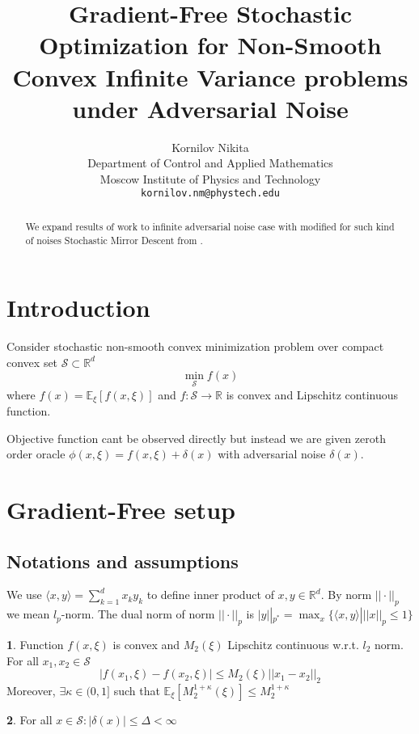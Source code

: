 \documentclass{article}
\title{Gradient-Free Stochastic Optimization for Non-Smooth Convex  Infinite Variance problems under Adversarial Noise}
\author{ Kornilov Nikita\\
	Department of Control and Applied Mathematics\\
	Moscow Institute of Physics and Technology\\
	\texttt{kornilov.nm@phystech.edu} \\
}
\date{}
\makeatletter
\newcommand{\RR}{\mathcal{R}}
\theoremstyle{definition}
\newtheorem*{assumption*}{\assumptionnumber}
\providecommand{\assumptionnumber}{}
\newenvironment{assumption}[2]
 {%
  \renewcommand{\assumptionnumber}{Assumption #1}%
  \begin{assumption*}%
  \protected@edef\@currentlabel{#1}%
 }
 {%
  \end{assumption*}
 }
\theoremstyle{remark}
\def\RR{\mathbb{R}}
\def\EE{\mathbb{E}}
\makeatother
\begin{document}
\maketitle

\begin{abstract}
We expand results of work \cite{dvinskikh2022gradient} to infinite adversarial noise case with modified for such kind of noises Stochastic Mirror Descent from \cite{vural2022mirror}. 
\end{abstract}



\section{Introduction}
Consider stochastic non-smooth convex minimization problem over compact convex set $\mathcal{S} \subset \RR^d$
$$\min\limits_{\mathcal{S}} f(x) $$
where $f(x) =  \EE_\xi [f(x, \xi)]$ and $f: \mathcal{S} \rightarrow \RR$ is convex and Lipschitz continuous function.

Objective function cant be observed directly but instead we are given zeroth order oracle $\phi(x,\xi) = f(x, \xi) +\delta(x) $ with adversarial noise $\delta(x)$.

\section{Gradient-Free setup}
\subsection{Notations and assumptions}
We use $\langle x,y \rangle = \sum_{k=1}^d x_ky_k$ to define inner product of $x,y \in \RR^d$. By norm $||\cdot||_p$ we mean $l_p$-norm. The dual norm of norm $||\cdot||_{p}$ is $|y||_{p^*} = \max_x \{\langle x, y \rangle | ||x||_p \leq 1\}$ 


\begin{assumption}{1}{} \label{1A}
Function $f(x, \xi)$ is convex and $M_2(\xi)$ Lipschitz continuous w.r.t. $l_2$ norm. For all $x_1, x_2 \in \mathcal{S}$
$$|f(x_1, \xi) - f(x_2, \xi)| \leq M_2(\xi) ||x_1 - x_2||_2$$
Moreover, $\exists \kappa \in (0,1] $  such that $\EE_\xi [M_2^{1+\kappa}(\xi)] \leq M_2^{1+\kappa}$
\end{assumption}

\begin{assumption}{2}{}\label{2A}
For all $x \in \mathcal{S}: |\delta(x)| \leq \Delta < \infty$
\end{assumption}
\end{document}
